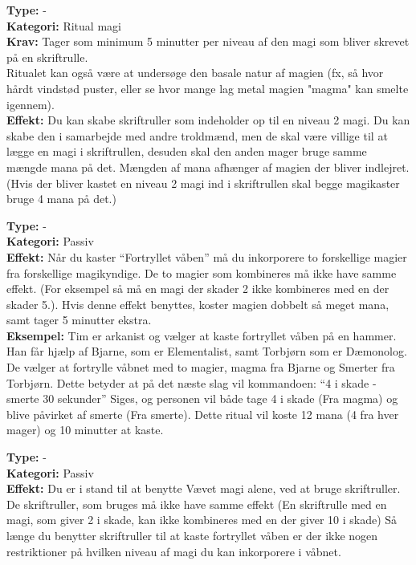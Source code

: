 \begin{lærdMagi*}
\textbf{Type:} -\\ 
\textbf{Kategori:} Ritual magi\\ 
\textbf{Krav:} Tager som minimum 5 minutter per niveau af den magi som bliver skrevet på en skriftrulle.\\ Ritualet kan også være at undersøge den basale natur af magien (fx, så hvor hårdt vindstød puster, eller se hvor mange lag metal magien "magma" kan smelte igennem).\\
\textbf{Effekt:} Du kan skabe skriftruller som indeholder op til en niveau 2 magi. Du kan skabe den i samarbejde med andre troldmænd, men de skal være villige til at lægge en magi i skriftrullen, desuden skal den anden mager bruge samme mængde mana på det. Mængden af mana afhænger af magien der bliver indlejret. (Hvis der bliver kastet en niveau 2 magi ind i skriftrullen skal begge magikaster bruge 4 mana på det.)
\end{lærdMagi*}

\begin{lærdMagi*}
\textbf{Type:} - \\
\textbf{Kategori:} Passiv\\
\textbf{Effekt:} Når du kaster “Fortryllet våben” må du inkorporere to forskellige magier fra forskellige magikyndige. De to magier som kombineres må ikke have samme effekt. (For eksempel så må en magi der skader 2 ikke kombineres med en der skader 5.). Hvis denne effekt benyttes, koster magien dobbelt så meget mana, samt tager 5 minutter ekstra.\\
\textbf{Eksempel:} Tim er arkanist og vælger at kaste fortryllet våben på en hammer. Han får hjælp af Bjarne, som er Elementalist, samt Torbjørn som er Dæmonolog. De vælger at fortrylle våbnet med to magier, magma fra Bjarne og Smerter fra Torbjørn. Dette betyder at på det næste slag vil kommandoen: “4 i skade - smerte 30 sekunder” Siges, og personen vil både tage 4 i skade (Fra magma) og blive påvirket af smerte (Fra smerte). Dette ritual vil koste 12 mana (4 fra hver mager) og 10 minutter at kaste.
\end{lærdMagi*}

\begin{lærdMagi*}
\textbf{Type:} - \\
\textbf{Kategori:} Passiv\\
\textbf{Effekt:} Du er i stand til at benytte Vævet magi alene, ved at bruge skriftruller. De skriftruller, som bruges må ikke have samme effekt (En skriftrulle med en magi, som giver 2 i skade, kan ikke kombineres med en der giver 10 i skade) Så længe du benytter skriftruller til at kaste fortryllet våben er der ikke nogen restriktioner på hvilken niveau af magi du kan inkorporere i våbnet.
\end{lærdMagi*}

